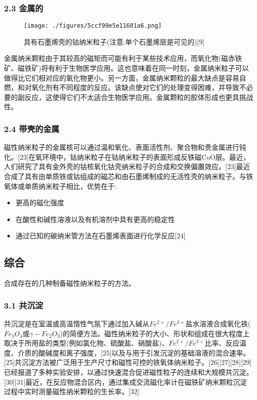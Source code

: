\subsubsection{2.3 金属的}
\begin{figure}[ht]
\centering
\texttt{[image: ./figures/5ccf99e5e11601a6.png]}
\caption{具有石墨烯壳的钴纳米粒子(注意:单个石墨烯层是可见的)[9]} \label{fig_CXNMLZ_2}
\end{figure}
金属纳米颗粒由于其较高的磁矩而可能有利于某些技术应用，而氧化物(磁赤铁矿、磁铁矿)将有利于生物医学应用。这也意味着在同一时刻，金属纳米粒子可以做得比它们相对应的氧化物更小。另一方面，金属纳米颗粒的最大缺点是容易自燃，和对氧化剂有不同程度的反应。该缺点使对它们的处理变得困难，并导致不必要的副反应，这使得它们不太适合生物医学应用。金属颗粒的胶体形成也更具挑战性。

\subsubsection{2.4 带壳的金属}
磁性纳米粒子的金属核可以通过温和氧化、表面活性剂、聚合物和贵金属进行钝化。[23]在氧环境中，钴纳米粒子在钴纳米粒子的表面形成反铁磁CoO层。最近，人们研究了具有金外壳的钴核氧化钴壳纳米粒子的合成和交换偏置效应。[23]最近合成了具有由单质铁或钴组成的磁芯和由石墨烯制成的无活性壳的纳米粒子。与铁氧体或单质纳米粒子相比，优势在于:
\begin{itemize}
\item 更高的磁化强度
\item 在酸性和碱性溶液以及有机溶剂中具有更高的稳定性
\item 通过已知的碳纳米管方法在石墨烯表面进行化学反应[24]
\end{itemize}

\subsection{综合}
合成存在的几种制备磁性纳米粒子的方法。

\subsubsection{3.1 共沉淀}
共沉淀是在室温或高温惰性气氛下通过加入碱从$Fe^{2+}/Fe^{3+}$盐水溶液合成氧化铁($Fe_3O_4\text{或}\gamma-Fe_2O_3$)的简便方法。磁性纳米粒子的大小、形状和组成在很大程度上取决于所用盐的类型(例如氯化物、硫酸盐、硝酸盐)、$Fe^{2+}/Fe^{3+}$比率、反应温度、介质的酸碱度和离子强度，[25]以及与用于引发沉淀的基础溶液的混合速率。[25]共沉淀方法被广泛用于生产尺寸和磁性可控的铁氧体纳米粒子。[26][27][28][29]已经报道了多种实验安排，以通过快速混合促进磁性粒子的连续和大规模共沉淀。[30][31]最近，在反应物混合区内，通过集成交流磁化率计在磁铁矿纳米颗粒沉淀过程中实时测量磁性纳米颗粒的生长率。[32]


